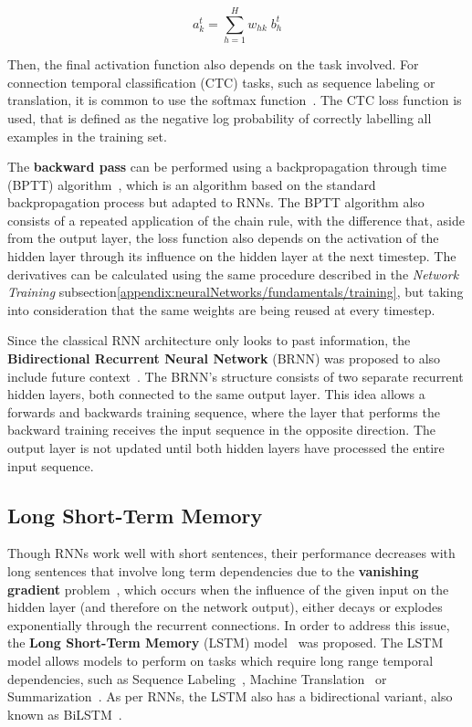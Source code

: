 \begin{equation} \label{eq:outputStateRNN}
    a_k^t = \sum_{h=1}^H w_{hk} \; b_{h}^{t}	
\end{equation}

Then, the final activation function also depends on the task involved. For connection 
temporal classification (CTC) tasks, such as sequence labeling or translation, it is common 
to use the softmax function~\cite{appendix:graves2006connectionist}. The CTC loss function is 
used, that is defined as the negative log probability of correctly labelling all examples in 
the training set.

The \textbf{backward pass} can be performed using a backpropagation through time (BPTT) 
algorithm~\cite{appendix:williams1995gradient, semPar:werbos1990}, which is an algorithm 
based on the standard backpropagation process but adapted to RNNs. The BPTT algorithm also 
consists of a repeated application of the chain rule, with the difference that, aside from 
the output layer, the loss function also depends on the activation of the hidden layer 
through its influence on the hidden layer at the next timestep. The derivatives can be 
calculated using the same procedure described in the \textit{Network Training} subsection\ref{appendix:neuralNetworks/fundamentals/training}, 
but taking into consideration that the same weights are being reused at every timestep.

Since the classical RNN architecture only looks to past information, the \textbf{Bidirectional 
Recurrent Neural Network} (BRNN) was proposed to also include future 
context~\cite{appendix:SchusterP97}. The BRNN’s structure consists of two separate recurrent 
hidden layers, both connected to the same output layer. This idea allows a forwards and 
backwards training sequence, where the layer that performs the backward training receives the 
input sequence in the opposite direction. The output layer is not updated until both hidden 
layers have processed the entire input sequence.

\subsection{Long Short-Term Memory}
\label{appendix:neuralNetworks/rnn/lstm}
Though RNNs work well with short sentences, their performance decreases with long sentences 
that involve long term dependencies due to the \textbf{vanishing gradient} 
problem~\cite{seqlab:HochreiterS97, appendix:hochreiter2001gradient}, which occurs when the 
influence of the given input on the hidden layer (and therefore on the network output), 
either decays or explodes exponentially through the recurrent connections. In order to 
address this issue, the \textbf{Long Short-Term Memory} (LSTM) model~\cite{seqlab:HochreiterS97} 
was proposed. The LSTM model allows models to perform on tasks which require long range 
temporal dependencies, such as Sequence Labeling~\cite{seqlab:HuangXY15, seqlab:MaH16}, 
Machine Translation~\cite{nlToSparql:WuSCLNMKCGMKSJL16} or Summarization~\cite{appendix:MahasseniLT17}. 
As per RNNs, the LSTM also has a bidirectional variant, also known as 
BiLSTM~\cite{appendix:graves2005framewise,appendix:ChenC04a,appendix:ThireouR07}. 

